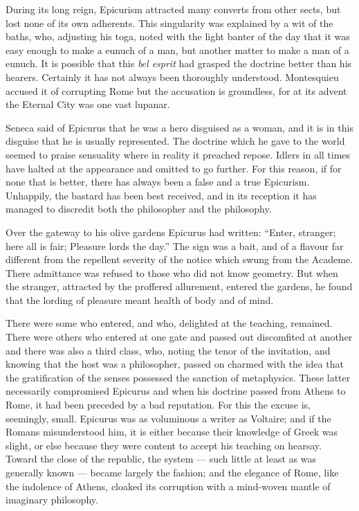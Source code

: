 \documentclass[]{book}
\begin{document}
During its long reign, Epicurism attracted many converts from other
sects, but lost none of its own adherents. This singularity was
explained by a wit of the baths, who, adjusting his toga, noted with the
light banter of the day that it was easy enough to make a eunuch of a
man, but another matter to make a man of a eunuch. It is possible that
this \emph{bel esprit} had grasped the doctrine better than his hearers.
Certainly it has not always been thoroughly understood. Montesquieu
accused it of corrupting Rome but the accusation is groundless, for at
its advent the Eternal City was one vast lupanar.

Seneca said of Epicurus that he was a hero disguised as a woman, and it
is in this disguise that he is usually represented. The doctrine which
he gave to the world seemed to praise sensuality where in reality it
preached repose. Idlers in all times have halted at the appearance and
omitted to go further. For this reason, if for none that is better,
there has always been a false and a true Epicurism. Unhappily, the
bastard has been best received, and in its reception it has managed to
discredit both the philosopher and the philosophy.

Over the gateway to his olive gardens Epicurus had written: ``Enter,
stranger; here all is fair; Pleasure lords the day.'' The sign was a
bait, and of a flavour far different from the repellent severity of the
notice which swung from the Academe. There admittance was refused to
those who did not know geometry. But when the stranger, attracted by the
proffered allurement, entered the gardens, he found that the lording of
pleasure meant health of body and of mind.

There were some who entered, and who, delighted at the teaching,
remained. There were others who entered at one gate and passed out
discomfited at another and there was also a third class, who, noting the
tenor of the invitation, and knowing that the host was a philosopher,
passed on charmed with the idea that the gratification of the senses
possessed the sanction of metaphysics. These latter necessarily
compromised Epicurus and when his doctrine passed from Athens to Rome,
it had been preceded by a bad reputation. For this the excuse is,
seemingly, small. Epicurus was as voluminous a writer as Voltaire; and
if the Romans misunderstood him, it is either because their knowledge of
Greek was slight, or else because they were content to accept his
teaching on hearsay. Toward the close of the republic, the system ---
such little at least as was generally known --- became largely the
fashion; and the elegance of Rome, like the indolence of Athens, cloaked
its corruption with a mind-woven mantle of imaginary philosophy.
\end{document}
